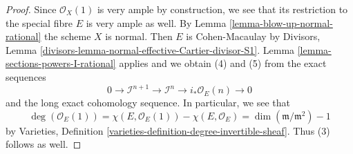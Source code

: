 \documentclass[10pt,a4paper]{amsart}
\theoremstyle{plain}
\theoremstyle{definition}
\theoremstyle{remark}
\numberwithin{equation}{subsection}
\begin{document}
\begin{proof}
Since $\mathcal{O}_X(1)$ is very ample by construction, we see that
its restriction to the special fibre $E$ is very ample as well.
By Lemma \ref{lemma-blow-up-normal-rational} the scheme $X$ is normal.
Then $E$ is Cohen-Macaulay by
Divisors, Lemma \ref{divisors-lemma-normal-effective-Cartier-divisor-S1}.
Lemma \ref{lemma-sections-powers-I-rational} applies and we obtain
(4) and (5) from the exact sequences
$$
0 \to \mathcal{I}^{n + 1} \to \mathcal{I}^n \to i_*\mathcal{O}_E(n) \to 0
$$
and the long exact cohomology sequence. In particular, we see that
$$
\deg(\mathcal{O}_E(1)) = \chi(E, \mathcal{O}_E(1)) - \chi(E, \mathcal{O}_E) =
\dim(\mathfrak m/\mathfrak m^2) - 1
$$
by Varieties, Definition \ref{varieties-definition-degree-invertible-sheaf}.
Thus (3) follows as well.
\end{proof}
\end{document}
